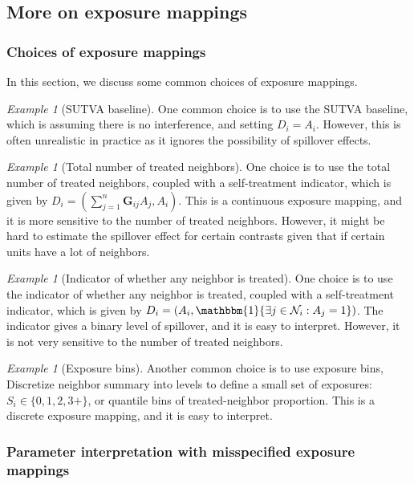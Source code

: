\documentclass[twoside]{article}
\theoremstyle{plain}
\theoremstyle{definition}
\theoremstyle{remark}
\newtheorem{example}[theorem]{Example}
\newcommand{\bG}{\boldsymbol{G}}
\newcommand{\cN}{\mathcal{N}}
\newcommand{\indicator}{\mathbbm{1}}
\newcommand{\sumj}{\sum_{j=1}^n}
\begin{document}
\subsection{More on exposure mappings}\label{sec:exposure_mapping}

\subsubsection{Choices of exposure mappings}

In this section, we discuss some common choices of exposure mappings.
\begin{example}[SUTVA baseline]
    One common choice is to use the SUTVA baseline, which is assuming there is no interference, and setting $D_i = A_i$. However, this is often unrealistic in practice as it ignores the possibility of spillover effects.
\end{example}

\begin{example}[Total number of treated neighbors]
    One choice is to use the total number of treated neighbors, coupled with a self-treatment indicator, which is given by $D_i = (\sumj \bG_{ij}A_j, A_i)$. This is a continuous exposure mapping, and it is more sensitive to the number of treated neighbors. However, it might be hard to estimate the spillover effect for certain contrasts given that if certain units have a lot of neighbors.
\end{example}

\begin{example}[Indicator of whether any neighbor is treated]
    One choice is to use the indicator of whether any neighbor is treated, coupled with a self-treatment indicator, which is given by $D_i = (A_i, \indicator{\exists j \in \cN_i : A_j = 1})$. The indicator gives a binary level of spillover, and it is easy to interpret. However, it is not very sensitive to the number of treated neighbors.
\end{example}

\begin{example}[Exposure bins]
    Another common choice is to use exposure bins, Discretize neighbor summary into levels to define a small set of exposures: $S_i \in \{0,1,2,3+\}$, or quantile bins of treated-neighbor proportion. This is a discrete exposure mapping, and it is easy to interpret.
\end{example}

\subsubsection{Parameter interpretation with misspecified exposure mappings}
\end{document}
